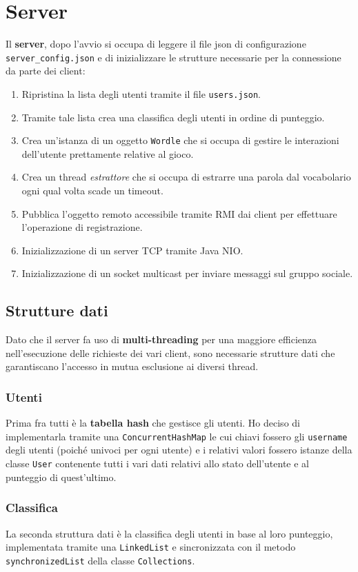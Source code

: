 \section{Server}
Il \textbf{server}, dopo l'avvio si occupa di leggere il file json di configurazione
\verb|server_config.json| e di inizializzare le strutture necessarie per la connessione da parte
dei client:
\begin{enumerate}
	\item Ripristina la lista degli utenti tramite il file \verb|users.json|.
	\item Tramite tale lista crea una classifica degli utenti in ordine di punteggio.
	\item Crea un'istanza di un oggetto \verb|Wordle| che si occupa di gestire le interazioni
	      dell'utente prettamente relative al gioco.
	\item Crea un thread \emph{estrattore} che si occupa di estrarre una parola dal vocabolario
	      ogni qual volta scade un timeout.
	\item Pubblica l'oggetto remoto accessibile tramite RMI dai client per effettuare l'operazione
	      di registrazione.
	\item Inizializzazione di un server TCP tramite Java NIO.
	\item Inizializzazione di un socket multicast per inviare messaggi sul gruppo sociale.
\end{enumerate}

\subsection{Strutture dati}
Dato che il server fa uso di \textbf{multi-threading} per una maggiore efficienza nell'esecuzione
delle richieste dei vari client, sono necessarie strutture dati che garantiscano l'accesso in
mutua esclusione ai diversi thread.

\subsubsection{Utenti}
Prima fra tutti è la \textbf{tabella hash} che gestisce gli utenti. Ho deciso di implementarla
tramite una \verb|ConcurrentHashMap| le cui chiavi fossero gli \verb|username| degli utenti (poiché
univoci per ogni utente) e i relativi valori fossero istanze della classe \verb|User| contenente
tutti i vari dati relativi allo stato dell'utente e al punteggio di quest'ultimo.

\subsubsection{Classifica}
La seconda struttura dati è la classifica degli utenti in base al loro punteggio, implementata
tramite una \verb|LinkedList| e sincronizzata con il metodo \verb|synchronizedList| della
classe \verb|Collections|.

